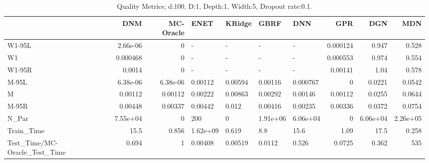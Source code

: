 \begin{table}
\centering
\caption{Quality Metrics; d:100, D:1, Depth:1, Width:5, Dropout rate:0.1.}
\begin{tabular}{lrrllllrrr}
\toprule
{} &      DNM &  MC-Oracle &     ENET &  KRidge &     GBRF &      DNN &      GPR &      DGN &      MDN \\
\midrule
W1-95L                        & 2.66e-06 &          0 &        - &       - &        - &        - & 0.000124 &    0.947 &    0.528 \\
W1                            & 0.000468 &          0 &        - &       - &        - &        - & 0.000553 &    0.974 &    0.554 \\
W1-95R                        &   0.0014 &          0 &        - &       - &        - &        - &  0.00141 &     1.04 &    0.578 \\
M-95L                         & 6.38e-06 &   6.38e-06 &  0.00112 & 0.00594 &  0.00116 & 0.000767 &        0 &   0.0221 &   0.0542 \\
M                             &  0.00112 &    0.00112 &  0.00222 & 0.00863 &  0.00292 &  0.00146 &  0.00112 &   0.0255 &   0.0644 \\
M-95R                         &  0.00448 &    0.00337 &  0.00442 &   0.012 &  0.00416 &  0.00235 &  0.00336 &   0.0372 &   0.0754 \\
N\_Par                         & 7.55e+04 &          0 &      200 &       0 & 1.91e+06 & 6.06e+04 &        0 & 6.06e+04 & 2.26e+05 \\
Train\_Time                    &     15.5 &      0.856 & 1.62e+09 &   0.619 &      8.8 &     15.6 &     1.09 &     17.5 &    0.258 \\
Test\_Time/MC-Oracle\_Test\_Time &    0.694 &          1 &  0.00408 & 0.00519 &   0.0112 &    0.526 &   0.0725 &    0.362 &      535 \\
\bottomrule
\end{tabular}
\end{table}
